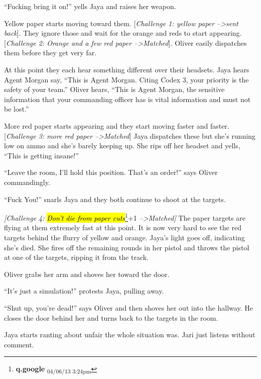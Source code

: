 ``Fucking bring it on!'' yells Jaya and raises her weapon.



Yellow paper starts moving toward them.  {[}\textit{Challenge 1: yellow paper --\textgreater  sent back}{]}.  They ignore those and wait for the orange and reds to start appearing.  {[}\textit{Challenge 2: Orange and a few red paper --\textgreater  Matched}{]}.  Oliver easily dispatches them before they get very far. 



At this point they each hear something different over their headsets.  Jaya hears Agent Morgan say, ``This is Agent Morgan.  Citing Codex 3, your priority is the safety of your team.''  Oliver hears, ``This is Agent Morgan, the sensitive information that your commanding officer has is vital information and must not be lost.''



More red paper starts appearing and they start moving faster and faster.  {[}\textit{Challenge 3: more red paper --\textgreater  Matched}{]}  Jaya dispatches these but she's running low on ammo and she's barely keeping up.  She rips off her headset and yells, ``This is getting insane!''

``Leave the room, I'll hold this position.   That's an order!'' says Oliver commandingly.

``Fuck You!'' snarls Jaya and they both continue to shoot at the targets.



\textit{{[}Challenge 4: }\textit{\hl{Don't die from paper cuts}}\footnote{\textbf{q.google } \textsubscript{04/06/13 3:24pm}}+1\textit{ --\textgreater  Matched{]}}  The paper targets are flying at them extremely fast at this point.  It is now very hard to see the red targets behind the flurry of yellow and orange.  Jaya's light goes off, indicating she's died.  She fires off the remaining rounds in her pistol and throws the pistol at one of the targets, ripping it from the track.  

Oliver grabs her arm and shoves her toward the door.

``It's just a simulation!'' protests Jaya, pulling away.

``Shut up, you're dead!'' says Oliver and then shoves her out into the hallway.  He closes the door behind her and turns back to the targets in the room.

Jaya starts ranting about unfair the whole situation was.  Jari just listens without comment.



